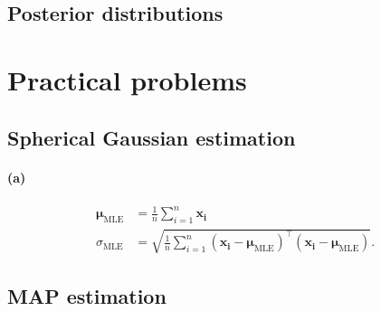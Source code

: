 \documentclass[a4paper,11pt]{article}
\begin{document}
	\subsection{Posterior distributions}
	\section{Practical problems}
	\subsection{Spherical Gaussian estimation}
	\paragraph{(a)}
	\begin{align*}
	\boldsymbol\mu_\textrm{MLE}&=\frac{1}{n}\sum_{i=1}^n\mathbf{x_i}\\
	\sigma_\textrm{MLE}&=\sqrt{\frac{1}{n}\sum_{i=1}^n(\mathbf{x_i}-\boldsymbol\mu_\textrm{MLE})^\top(\mathbf{x_i}-\boldsymbol\mu_\textrm{MLE})}.
	\end{align*}
	\subsection{MAP estimation}
\end{document}
